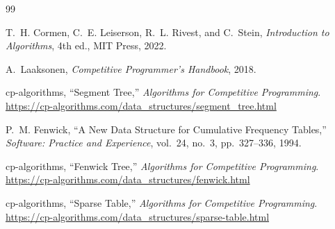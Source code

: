 \documentclass[
  11pt,
  a4paper,
  twoside=false,
  numbers=noenddot,
  headings=big,
  parskip=half,
  toc=bibliography,
  toc=listof,
  bibliography=totoc
]{scrreprt}
\begin{document}
\begin{thebibliography}{99}

T.~H. Cormen, C.~E. Leiserson, R.~L. Rivest, and C.~Stein, \textit{Introduction to Algorithms}, 4th ed., MIT Press, 2022.

A.~Laaksonen, \textit{Competitive Programmer's Handbook}, 2018.

cp-algorithms, ``Segment Tree,'' \textit{Algorithms for Competitive Programming}. \url{https://cp-algorithms.com/data_structures/segment_tree.html}

P.~M. Fenwick, ``A New Data Structure for Cumulative Frequency Tables,'' \textit{Software: Practice and Experience}, vol.~24, no.~3, pp.~327--336, 1994.

cp-algorithms, ``Fenwick Tree,'' \textit{Algorithms for Competitive Programming}. \url{https://cp-algorithms.com/data_structures/fenwick.html}

cp-algorithms, ``Sparse Table,'' \textit{Algorithms for Competitive Programming}. \url{https://cp-algorithms.com/data_structures/sparse-table.html}

\end{thebibliography}
\end{document}
